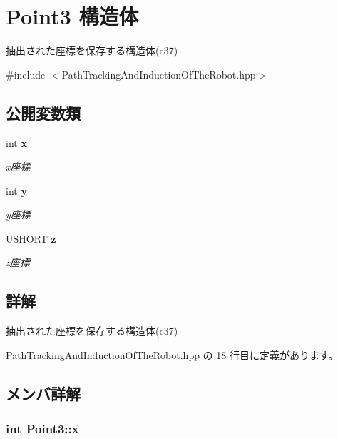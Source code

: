 \section{Point3 構造体}
\label{struct_point3}


抽出された座標を保存する構造体(c37)  




{\ttfamily \#include $<$Path\-Tracking\-And\-Induction\-Of\-The\-Robot.\-hpp$>$}

\subsection*{公開変数類}
\begin{DoxyCompactItemize}
\item 
int {\bf x}
\begin{DoxyCompactList}\small\item\em x座標 \end{DoxyCompactList}\item 
int {\bf y}
\begin{DoxyCompactList}\small\item\em y座標 \end{DoxyCompactList}\item 
U\-S\-H\-O\-R\-T {\bf z}
\begin{DoxyCompactList}\small\item\em z座標 \end{DoxyCompactList}\end{DoxyCompactItemize}


\subsection{詳解}
抽出された座標を保存する構造体(c37) 

 Path\-Tracking\-And\-Induction\-Of\-The\-Robot.\-hpp の 18 行目に定義があります。



\subsection{メンバ詳解}
\subsubsection[{x}]{\setlength{\rightskip}{0pt plus 5cm}int Point3\-::x}\label{struct_point3_a92f702275b1efaf2f94dd1ec4906eddc}


